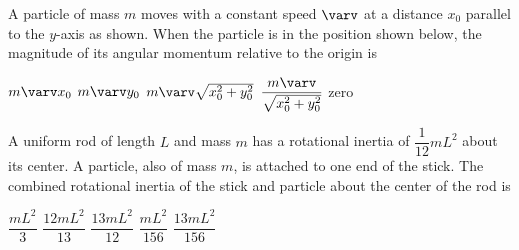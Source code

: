 \documentclass{../../oss-classkick-exam}
\begin{document}
\begin{multicols*}{2}
\begin{questions}
    \question A particle of mass $m$ moves with a constant speed $\varv$ at a
    distance $x_0$ parallel to the $y$-axis as shown. When the particle is in
    the position shown below, the magnitude of its angular momentum relative to
    the origin is
    \begin{center}
    \end{center}
    \begin{choices}
      \choice $m\varv x_0$
      \choice $m\varv y_0$
      \choice $m\varv\sqrt{x_0^2+y_0^2}$
      \choice $\dfrac{m\varv}{\sqrt{x_0^2+y_0^2}}$
      \choice zero
    \end{choices}
    
    \question A uniform rod of length $L$ and mass $m$ has a rotational inertia
    of $\dfrac1{12}mL^2$ about its center. A particle, also of mass $m$, is
    attached to one end of the stick. The combined rotational inertia of the
    stick and particle about the center of the rod is
    \begin{center}
    \end{center}
    \begin{choices}
      \choice$\dfrac{mL^2}3$
      \choice$\dfrac{12mL^2}{13}$
      \choice$\dfrac{13mL^2}{12}$
      \choice$\dfrac{mL^2}{156}$
      \choice$\dfrac{13mL^2}{156}$
    \end{choices}


\end{questions}
\end{multicols*}
\end{document}
